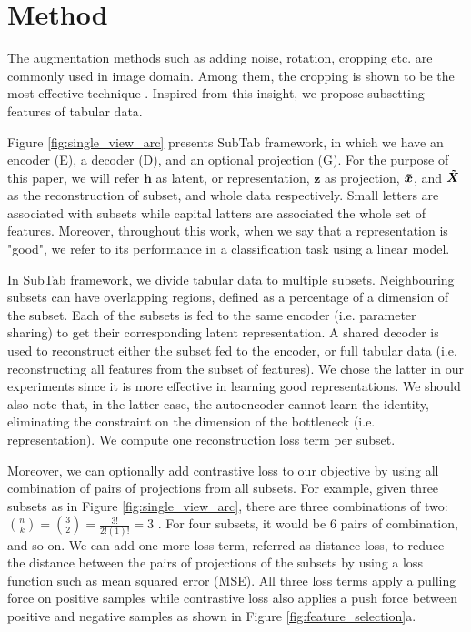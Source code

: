 \section{Method}\label{method}

The augmentation methods such as adding noise, rotation, cropping etc. are commonly used in image domain. Among them, the cropping is shown to be the most effective technique \citep{chen2020simple}. Inspired from this insight, we propose subsetting features of tabular data. 

Figure \ref{fig:single_view_arc} presents SubTab framework, in which we have an encoder (E), a decoder (D), and an optional projection (G). For the purpose of this paper, we will refer $\boldsymbol{h}$ as latent, or representation, $\boldsymbol{z}$ as projection, $\boldsymbol{\Tilde{x}}$, and $\boldsymbol{\Tilde{X}}$ as the reconstruction of subset, and whole data respectively. Small letters are associated with subsets while capital latters are associated the whole set of features. Moreover, throughout this work, when we say that a representation is "good", we refer to its performance in a classification task using a linear model.

In SubTab framework, we divide tabular data to multiple subsets. Neighbouring subsets can have overlapping regions, defined as a percentage of a dimension of the subset. Each of the subsets is fed to the same encoder (i.e. parameter sharing) to get their corresponding latent representation. A shared decoder is used to reconstruct either the subset fed to the encoder, or full tabular data (i.e. reconstructing all features from the subset of features). We chose the latter in our experiments since it is more effective in learning good representations. We should also note that, in the latter case, the autoencoder cannot learn the identity, eliminating the constraint on the dimension of the bottleneck (i.e. representation). We compute one reconstruction loss term per subset. 

Moreover, we can optionally add contrastive loss to our objective by using all combination of pairs of projections from all subsets. For example, given three subsets as in Figure \ref{fig:single_view_arc}, there are three combinations of two: $\binom{n}{k} = \binom{3}{2} = \frac{3!}{2!(1)!} = 3$ . For four subsets, it would be 6 pairs of combination, and so on. We can add one more loss term, referred as distance loss, to reduce the distance between the pairs of projections of the subsets by using a loss function such as mean squared error (MSE). All three loss terms apply a pulling force on positive samples while contrastive loss also applies a push force between positive and negative samples as shown in Figure \ref{fig:feature_selection}a.

